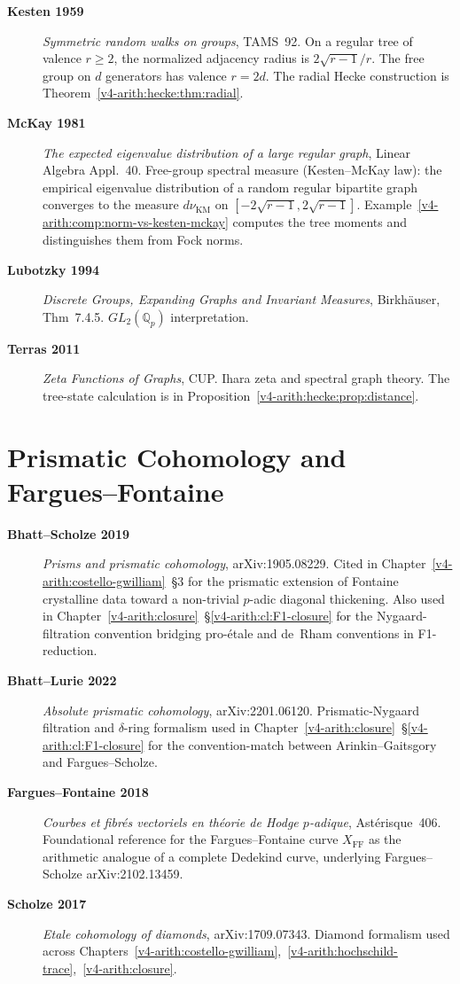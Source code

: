 \begin{description}
\item[\textbf{Kesten 1959}] \emph{Symmetric random walks on groups},
TAMS~92. On a regular tree of valence \(r\ge2\), the normalized
adjacency radius is \(2\sqrt{r-1}/r\). The free group on \(d\)
generators has valence \(r=2d\). The radial Hecke construction is
Theorem~\ref{v4-arith:hecke:thm:radial}.
\item[\textbf{McKay 1981}] \emph{The expected eigenvalue
distribution of a large regular graph}, Linear Algebra Appl.~40.
Free-group spectral measure (Kesten--McKay law): the empirical
eigenvalue distribution of a random regular bipartite graph
converges to the measure \(d\nu_{\mathrm{KM}}\) on \([-2\sqrt{r-1},
2\sqrt{r-1}]\). Example~\ref{v4-arith:comp:norm-vs-kesten-mckay}
computes the tree moments and distinguishes them from Fock norms.
\item[\textbf{Lubotzky 1994}] \emph{Discrete Groups, Expanding
Graphs and Invariant Measures}, Birkh\"auser, Thm~7.4.5. \(GL_{2}(\mathbb{Q}_{p})\)
interpretation.
\item[\textbf{Terras 2011}] \emph{Zeta Functions of Graphs}, CUP.
Ihara zeta and spectral graph theory. The tree-state calculation
is in Proposition~\ref{v4-arith:hecke:prop:distance}.
\end{description}

\section{Prismatic Cohomology and Fargues--Fontaine}
\label{v4-arith:app:A:prismatic}

\begin{description}
\item[\textbf{Bhatt--Scholze 2019}] \emph{Prisms and prismatic
cohomology}, arXiv:1905.08229. Cited in
Chapter~\ref{v4-arith:costello-gwilliam}~\S3 for the prismatic
extension of Fontaine crystalline data toward a non-trivial
\(p\)-adic diagonal thickening. Also used in
Chapter~\ref{v4-arith:closure}~\S\ref{v4-arith:cl:F1-closure} for the
Nygaard-filtration convention bridging pro-\'etale and de~Rham
conventions in F1-reduction.
\item[\textbf{Bhatt--Lurie 2022}] \emph{Absolute prismatic
cohomology}, arXiv:2201.06120. Prismatic-Nygaard filtration and
\(\delta\)-ring formalism used in
Chapter~\ref{v4-arith:closure}~\S\ref{v4-arith:cl:F1-closure}
for the convention-match between Arinkin--Gaitsgory and
Fargues--Scholze.
\item[\textbf{Fargues--Fontaine 2018}] \emph{Courbes et fibr\'es
vectoriels en th\'eorie de Hodge \(p\)-adique}, Ast\'erisque~406.
Foundational reference for the Fargues--Fontaine curve
\(X_{\mathrm{FF}}\) as the arithmetic analogue of a complete
Dedekind curve, underlying Fargues--Scholze arXiv:2102.13459.
\item[\textbf{Scholze 2017}] \emph{Etale cohomology of diamonds},
arXiv:1709.07343. Diamond formalism used across
Chapters~\ref{v4-arith:costello-gwilliam},~\ref{v4-arith:hochschild-trace},~\ref{v4-arith:closure}.
\end{description}

